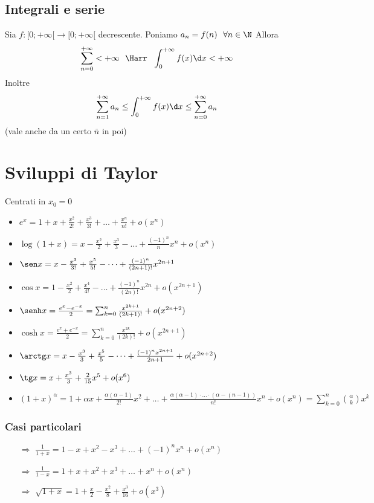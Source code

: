 \subsection{Integrali e serie}
\begin{shadedTheorem}
    Sia $f:[0;+\infty[\to [0;+\infty[$ decrescente. Poniamo $a_n=f(n)~~\forall n \in \N$
    Allora
    \[\sum_{n=0}^{+\infty}<+\infty~~\Harr~~\int_0^{+\infty}f(x)\d x<+\infty\]
    Inoltre
    \[\sum_{n=1}^{+\infty}a_n\leq \int_0^{+\infty}f(x)\d x\leq \sum_{n=0}^{+\infty}a_n\]
    (vale anche da un certo $\bar n$ in poi)
\end{shadedTheorem}

\section{Sviluppi di Taylor}
Centrati in $x_0=0$
\begin{itemize}
    \item $e^x=1+x+\frac{x^2}{2!}+\frac{x^3}{3!}+\dots+\frac{x^n}{n!}+o(x^n)$
    \item $\log(1+x)=x-\frac{x^2}{2}+\frac{x^3}{3}-\dots+\frac{(-1)^n}{n}x^n+o(x^n)$
    \item $\sen x = x-\frac{x^3}{3!}+\frac{x^5}{5!}-\dots+\frac{(-1)^n}{(2n+1)!}x^{2n+1}$
    \item $\cos x = 1-\frac{x^2}{2}+\frac{x^4}{4!}-\dots+\frac{(-1)^n}{(2n)!}x^{2n}+o\left(x^{2n+1}\right)$
    \item $\senh x = \frac{e^x-e^{-x}}{2}=\sum_{k=0}^n\frac{x^{2k+1}}{(2k+1)!}+o(x^{2n+2})$
    \item $\cosh x = \frac{e^x+e^{-x}}{2}=\sum_{k=0}^n\frac{x^{2k}}{(2k)!}+o(x^{2n+1})$
    \item $\arctg x = x-\frac{x^3}{3}+\frac{x^5}{5}-\dots+\frac{(-1)^nx^{2n+1}}{2n+1}+o(x^{2n+2})$
    \item $\tg x = x+\frac{x^3}{3}+\frac{2}{15}x^5+o(x^6)$
    \item $(1+x)^\alpha=1+\alpha x+\frac{\alpha(\alpha-1)}{2!}x^2+\dots+\frac{\alpha(\alpha-1)\cdot \ldots\cdot (\alpha-(n-1))}{n!}x^n+o(x^n)=\sum_{k=0}^n
    \binom{\alpha}{k}x^k$
\end{itemize}
\subsubsection*{Casi particolari}
\begin{itemize}
    \item[$\Rightarrow$] $\frac{1}{1+x}=1-x+x^2-x^3+\dots+(-1)^nx^n+o(x^n)$
    \item[$\Rightarrow$] $\frac{1}{1-x}=1+x+x^2+x^3+\dots+x^n+o(x^n)$
    \item[$\Rightarrow$] $\sqrt{1+x}=1+\frac{x}{2}-\frac{x^2}{8}+\frac{x^3}{16}+o(x^3)$
\end{itemize}